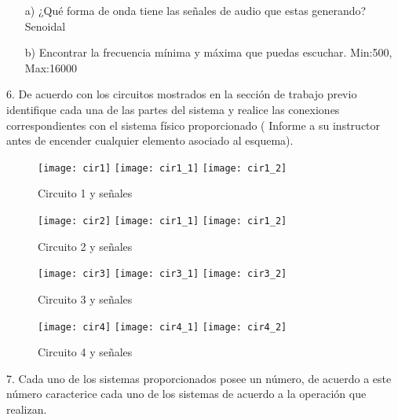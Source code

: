 \begin{itemize}
	\item[a)] ¿Qué forma de onda tiene las señales de audio que estas generando?
	\subitem Senoidal
	\item[b)] Encontrar la frecuencia mínima y máxima que puedas escuchar.
	\subitem Min:500, Max:16000
\end{itemize}

6. De acuerdo con los circuitos mostrados en la sección de trabajo previo identifique cada una de las partes del sistema y realice las conexiones correspondientes con el sistema físico proporcionado (
Informe a su instructor antes de encender cualquier elemento asociado al esquema).

\newpage


\begin{figure}[!h]
	\caption{Circuito 1 y señales}
	\centering
	\texttt{[image: cir1]}
	\texttt{[image: cir1\_1]}
	\texttt{[image: cir1\_2]}
	
\end{figure}

\noindent \justifying


\newpage



\begin{figure}[!h]
	\caption{Circuito 2 y señales}
	\centering
	\texttt{[image: cir2]}
	\texttt{[image: cir1\_1]}
	\texttt{[image: cir1\_2]}
	
\end{figure}

\noindent \justifying

\newpage


\begin{figure}[!h]
	\caption{Circuito 3 y señales}
	\centering
	\texttt{[image: cir3]}
	\texttt{[image: cir3\_1]}
	\texttt{[image: cir3\_2]}
\end{figure}

\newpage


\begin{figure}[!h]
	\caption{Circuito 4 y señales}
	\centering
	\texttt{[image: cir4]}
	\texttt{[image: cir4\_1]}
	\texttt{[image: cir4\_2]}
	
\end{figure}




7. Cada uno de los sistemas proporcionados posee un número, de acuerdo a este número caracterice cada uno de los sistemas de acuerdo a la operación que realizan. \\

